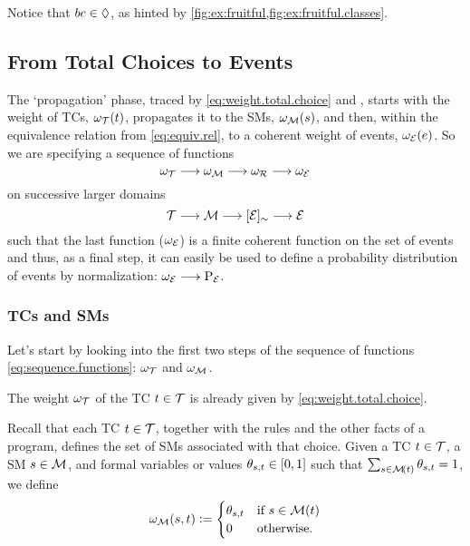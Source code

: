 \documentclass[x11names]{tlp}
\begin{document}
\begin{example}
		Notice that $bc \in \Diamond$, as hinted by
		\cref{fig:ex:fruitful,fig:ex:fruitful.classes}.
	\end{example}
\fi

\subsection{From Total Choices to Events}
\label{subsec:from.tchoices.to.events}

The `propagation' phase, traced by \cref{eq:weight.total.choice} and , starts with the weight of \aclp{TC}, $\wgtT\at{t}$, propagates it to the \aclp{SM}, $\wgtm{s}$, and then, within the equivalence relation from \cref{eq:equiv.rel}, to a coherent weight of events,
$\wgte{e}$.
So we are specifying a sequence of functions
\begin{equation}
	\omega_{{\mathcal{T}}} \longrightarrow \omega_{{\mathcal{M}}} \longrightarrow \omega_{{\mathcal{R}}} \longrightarrow \omega_{{\mathcal{E}}}\label{eq:sequence.functions}
\end{equation}
on successive larger domains
$$
{\mathcal{T}} \longrightarrow {\mathcal{M}} \longrightarrow [{{\mathcal{E}}}]_{\sim} \longrightarrow {\mathcal{E}}
$$
such that the last function ($\omega_{{\mathcal{E}}}$) is a finite coherent function on the set of events and thus, as a final step, it can easily be used to define a probability distribution of events by normalization:
\(
\omega_{{\mathcal{E}}} \longrightarrow \mathrm{P}_{{\mathcal{E}}}
\).

\subsubsection*{\Aclp{TC} and \Aclp{SM}}
\label{par:prop.totalchoices}

Let's start by looking into the first two steps of the sequence of functions \cref{eq:sequence.functions}: $\omega_{{\mathcal{T}}}$ and $\omega_{{\mathcal{M}}}$.

The weight $\omega_{{\mathcal{T}}}$ of the \acl{TC} $t \in {\mathcal{T}}$ is already given by \cref{eq:weight.total.choice}.

Recall that each \acl{TC} $t \in {\mathcal{T}}$, together with the rules and the other facts of a program, defines the set  of \aclp{SM} associated with that choice.
Given a \acl{TC} $t \in {\mathcal{T}}$, a \acl{SM}
$s \in {\mathcal{M}} $, and formal variables or values $\theta_{s,t} \in
	\intcc{0, 1}$ such that $\sum_{s\in \tcgen{t}} \theta_{s,t} = 1$, we define
\begin{equation}
	\wgtm{s, t} := \begin{cases}
		              \theta_{s,t} & \text{if~} s \in \tcgen{t}\cr 0 & \text{otherwise.}
	              \end{cases}
	\label{eq:weight.stablemodel}
\end{equation}
\end{document}
